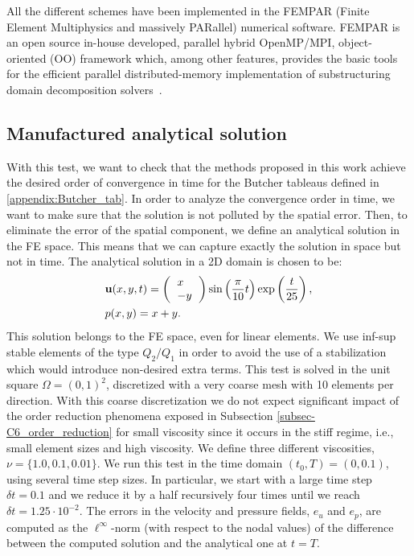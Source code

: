 All the different schemes have been implemented in the FEMPAR (Finite Element Multiphysics and massively PARallel)  numerical software. FEMPAR is an open source in-house developed, parallel hybrid OpenMP/MPI, object-oriented (OO) framework which, among other features, provides the basic tools for the efficient  parallel distributed-memory implementation  of substructuring domain decomposition solvers~\cite{badia_implementation_2013,badia_highly_2014}.

\subsection{Manufactured analytical solution}
\label{subsec-C6_manufactured}

With this test, we want to check that the methods proposed in this work achieve the desired order of convergence in time for the Butcher tableaus defined in \ref{appendix:Butcher_tab}. In order to analyze the convergence order in time, we want to make sure that the solution is not polluted by the spatial error. Then, to eliminate the error of the spatial component, we define an analytical solution in the FE space. This means that we can capture exactly the solution in space but not in time. The analytical solution in a 2D domain is chosen to be:
\begin{align}
\label{eq-C6_analytical_u}
&\u(x,y,t) = \left( \begin{tabular}{l}
$x$\\
$-y$
\end{tabular}\right)\sin\left(\frac{\pi}{10}t\right)\exp\left(\frac{t}{25}\right),\\
\label{eq-C6_analytical_p}
&p(x,y) = x+y.
\end{align}
This solution belongs to the FE space, even for linear elements. We use inf-sup stable elements of the type $Q_2/Q_1$ in order to avoid the use of a stabilization which would introduce non-desired extra terms.  This test is solved in the unit square $\Omega=(0,1)^2$, discretized with a very coarse mesh with 10 elements per direction. With this coarse discretization we do not expect significant impact of the order reduction phenomena exposed in Subsection \ref{subsec-C6_order_reduction} for small viscosity since it occurs in the stiff regime, i.e.,  small element sizes and high viscosity. We define three different viscosities, $\nu=\{1.0,0.1,0.01\}$. We run this test in the time domain $(t_0,T) = (0,0.1)$, using several time step sizes. In particular, we start with a large time step $\delta t=0.1$ and we reduce it by a half recursively four times until we reach $\delta t=1.25\cdot10^{-2}$. The errors in the velocity and pressure fields, $e_u$ and $e_p$, are computed as the $\ell^\infty$-norm (with respect to the nodal values) of the difference between the computed solution and the analytical one at $t=T$. %
